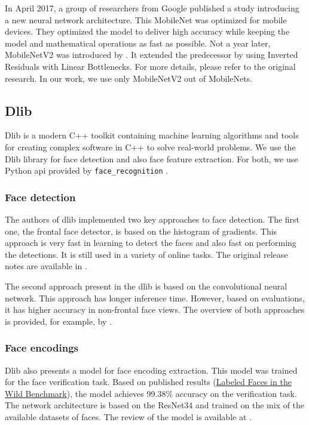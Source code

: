 In April 2017, a group of researchers from Google published a study \citep{mobilenet} introducing a new neural network architecture. This MobileNet was optimized for mobile devices. They optimized the model to deliver high accuracy while keeping the model and mathematical operations as fast as possible. Not a year later, MobileNetV2 was introduced by \cite{mobilenetv2}. It extended the predecessor by using Inverted Residuals with Linear Bottlenecks. For more details, please refer to the original research. In our work, we use only MobileNetV2 out of MobileNets.


\subsection{Dlib}
\label{s:dlib}

Dlib \citep{king2009dlib} is a modern C++ toolkit containing machine learning algorithms and tools for creating complex software in C++ to solve real-world problems. We use the Dlib library for face detection and also face feature extraction. For both, we use Python \acrshort{api} provided by \verb+face_recognition+ \citep{geitgey2016machine}. 

\subsubsection*{Face detection}

The authors of dlib implemented two key approaches to face detection. The first one, the frontal face detector, is based on the histogram of gradients. This approach is very fast in learning to detect the faces and also fast on performing the detections. It is still used in a variety of online tasks. The original release notes are available in \citep{king2017dlib_hog}.

The second approach present in the dlib is based on the convolutional neural network. This approach has longer inference time. However, based on evaluations, it has higher accuracy in non-frontal face views. The overview of both approaches is provided, for example, by \citep{arun2018cnndlib}.

\subsubsection*{Face encodings}

Dlib also presents a model for face encoding extraction. This model was trained for the face verification task. Based on published results (\href{http://vis-www.cs.umass.edu/lfw/results.html}{Labeled Faces in the Wild Benchmark}), the model achieves  99.38\% accuracy on the verification task. The network architecture is based on the ResNet34 and trained on the mix of the available datasets of faces. The review of the model is available at \citep{king2017high}.

